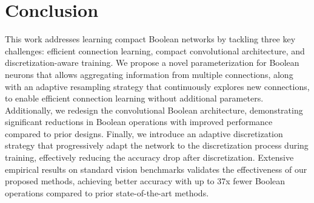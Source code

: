 \section{Conclusion} \label{sec:conclusion}

This work addresses learning compact Boolean networks by tackling three key challenges:
efficient connection learning, compact convolutional architecture, and discretization-aware training. 
We propose a novel parameterization for Boolean neurons that allows aggregating information from multiple connections, along with an adaptive resampling strategy that  continuously explores new connections, 
to enable  efficient connection learning without additional parameters. 
Additionally, we redesign the convolutional Boolean architecture, demonstrating significant reductions in Boolean operations with improved performance compared to prior designs. 
Finally, we introduce an adaptive discretization strategy that progressively adapt the network to the discretization process during training, effectively reducing the accuracy drop after discretization. Extensive empirical results on standard vision benchmarks validates the effectiveness of our proposed methods, 
achieving better accuracy with up to 37x fewer Boolean operations compared to prior state-of-the-art methods.
